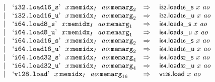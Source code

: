 $$\begin{array}[t]{@{}lrrl@{}l@{}l@{}l@{}}
& & | & \mbox{‘\texttt{i32.load16\_s}’}~~x{:}{{\mathtt{memidx}}}_{I}~~{\mathit{ao}}{:}{{\mathtt{memarg}}}_{2} & \quad\Rightarrow\quad{} & {\mathsf{i{\scriptstyle 32}}{.}\mathsf{load}}{{\mathsf{{\scriptstyle 16}}}{\mathsf{\_}}{\mathsf{s}}}~x~{\mathit{ao}} \\
& & | & \mbox{‘\texttt{i32.load16\_u}’}~~x{:}{{\mathtt{memidx}}}_{I}~~{\mathit{ao}}{:}{{\mathtt{memarg}}}_{2} & \quad\Rightarrow\quad{} & {\mathsf{i{\scriptstyle 32}}{.}\mathsf{load}}{{\mathsf{{\scriptstyle 16}}}{\mathsf{\_}}{\mathsf{u}}}~x~{\mathit{ao}} \\
& & | & \mbox{‘\texttt{i64.load8\_s}’}~~x{:}{{\mathtt{memidx}}}_{I}~~{\mathit{ao}}{:}{{\mathtt{memarg}}}_{1} & \quad\Rightarrow\quad{} & {\mathsf{i{\scriptstyle 64}}{.}\mathsf{load}}{{\mathsf{{\scriptstyle 8}}}{\mathsf{\_}}{\mathsf{s}}}~x~{\mathit{ao}} \\
& & | & \mbox{‘\texttt{i64.load8\_u}’}~~x{:}{{\mathtt{memidx}}}_{I}~~{\mathit{ao}}{:}{{\mathtt{memarg}}}_{1} & \quad\Rightarrow\quad{} & {\mathsf{i{\scriptstyle 64}}{.}\mathsf{load}}{{\mathsf{{\scriptstyle 8}}}{\mathsf{\_}}{\mathsf{u}}}~x~{\mathit{ao}} \\
& & | & \mbox{‘\texttt{i64.load16\_s}’}~~x{:}{{\mathtt{memidx}}}_{I}~~{\mathit{ao}}{:}{{\mathtt{memarg}}}_{2} & \quad\Rightarrow\quad{} & {\mathsf{i{\scriptstyle 64}}{.}\mathsf{load}}{{\mathsf{{\scriptstyle 16}}}{\mathsf{\_}}{\mathsf{s}}}~x~{\mathit{ao}} \\
& & | & \mbox{‘\texttt{i64.load16\_u}’}~~x{:}{{\mathtt{memidx}}}_{I}~~{\mathit{ao}}{:}{{\mathtt{memarg}}}_{2} & \quad\Rightarrow\quad{} & {\mathsf{i{\scriptstyle 64}}{.}\mathsf{load}}{{\mathsf{{\scriptstyle 16}}}{\mathsf{\_}}{\mathsf{u}}}~x~{\mathit{ao}} \\
& & | & \mbox{‘\texttt{i64.load32\_s}’}~~x{:}{{\mathtt{memidx}}}_{I}~~{\mathit{ao}}{:}{{\mathtt{memarg}}}_{4} & \quad\Rightarrow\quad{} & {\mathsf{i{\scriptstyle 64}}{.}\mathsf{load}}{{\mathsf{{\scriptstyle 32}}}{\mathsf{\_}}{\mathsf{s}}}~x~{\mathit{ao}} \\
& & | & \mbox{‘\texttt{i64.load32\_u}’}~~x{:}{{\mathtt{memidx}}}_{I}~~{\mathit{ao}}{:}{{\mathtt{memarg}}}_{4} & \quad\Rightarrow\quad{} & {\mathsf{i{\scriptstyle 64}}{.}\mathsf{load}}{{\mathsf{{\scriptstyle 32}}}{\mathsf{\_}}{\mathsf{u}}}~x~{\mathit{ao}} \\
& & | & \mbox{‘\texttt{v128.load}’}~~x{:}{{\mathtt{memidx}}}_{I}~~{\mathit{ao}}{:}{{\mathtt{memarg}}}_{16} & \quad\Rightarrow\quad{} & \mathsf{v{\scriptstyle 128}}{.}\mathsf{load}~x~{\mathit{ao}} \\

\end{array}$$
